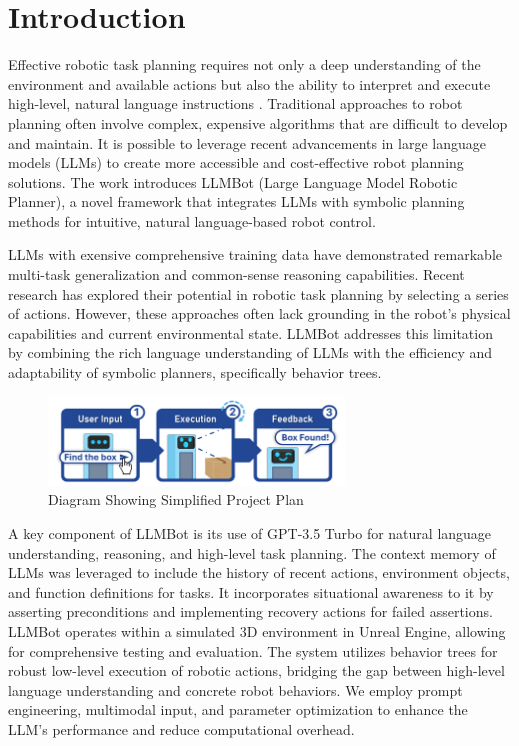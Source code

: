 \documentclass[pdflatex,sn-mathphys-num]{sn-jnl}
\theoremstyle{thmstyleone}
\theoremstyle{thmstyletwo}%
\theoremstyle{thmstylethree}%
\begin{document}
\maketitle


\section{Introduction}\label{sec1}
Effective robotic task planning requires not only a deep understanding of the environment and available actions but also the ability to interpret and execute high-level, natural language instructions \cite{iovino2022survey}. Traditional approaches to robot planning often involve complex, expensive algorithms that are difficult to develop and maintain. It is possible to leverage recent advancements in large language models (LLMs) to create more accessible and cost-effective robot planning solutions\cite{vemprala2023chatgpt}. The work introduces LLMBot (Large Language Model Robotic Planner), a novel framework that integrates LLMs with symbolic planning methods for intuitive, natural language-based robot control.

LLMs with exensive comprehensive training data have demonstrated remarkable multi-task generalization and common-sense reasoning capabilities\cite{naveed2024comprehensive}. Recent research has explored their potential in robotic task planning by selecting a series of actions. However, these approaches often lack grounding in the robot's physical capabilities and current environmental state\cite{jiang2022vima}. LLMBot addresses this limitation by combining the rich language understanding of LLMs with the efficiency and adaptability of symbolic planners, specifically behavior trees.
\begin{figure}[H]
\centering
\includegraphics[width=0.7\textwidth]{figures/Picture13.png}
\caption{Diagram Showing Simplified Project Plan}\label{fig1}
\end{figure}

A key component of LLMBot is its use of GPT-3.5 Turbo for natural language understanding, reasoning, and high-level task planning. The context memory of LLMs was leveraged to include the history of recent actions, environment objects, and function definitions for tasks. It incorporates situational awareness to it by asserting preconditions and implementing recovery actions for failed assertions. LLMBot operates within a simulated 3D environment in Unreal Engine, allowing for comprehensive testing and evaluation. The system utilizes behavior trees for robust low-level execution of robotic actions, bridging the gap between high-level language understanding and concrete robot behaviors. We employ prompt engineering, multimodal input, and parameter optimization to enhance the LLM's performance and reduce computational overhead.
\vfill
\end{document}
